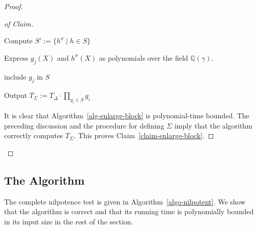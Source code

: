 \documentclass[prodmod,acmtalg]{acmsmall}
\newcommand{\Q}{\ensuremath{\mathbb{Q}}}
\begin{document}
\begin{proof}
\begin{proof}[of Claim]
\begin{algorithm}
	  { %

	    Compute $S' := \{ h^\sigma\mid h\in
	    S\}$\

		{%

		  Express $g_j(X)$ and $h^\sigma(X)$ as polynomials
		  over the field $\Q(\gamma)$.

                      {include $g_j$ in $S$}%

		}%


	  }%

		Output $T_\Sigma:=T_\Delta\cdot\prod_{g_i \in S}
    g_i$
  \end{algorithm}

  It is clear that Algorithm~\ref{alg-enlarge-block} is
  polynomial-time bounded. The preceding discussion and the procedure
  for defining $\Sigma$ imply that the algorithm correctly computes
  $T_\Sigma$. This proves Claim~\ref{claim-enlarge-block}.
\end{proof}

\end{proof}

\subsection*{The Algorithm}

The complete nilpotence test is given in
Algorithm~\ref{algo-nilpotent}. We show that the algorithm is correct
and that its running time is polynomially bounded in its input size in
the rest of the section.
\end{document}
